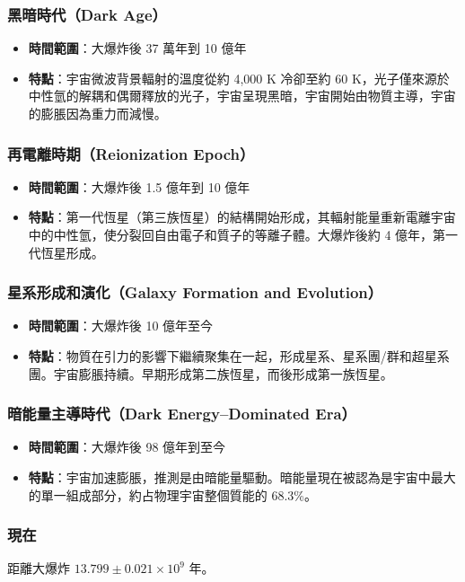 \documentclass[a4paper,12pt]{report}
\begin{document}
\subsubsection{黑暗時代（Dark Age）}
\begin{itemize}
\item \textbf{時間範圍}：大爆炸後 37 萬年到 10 億年
\item \textbf{特點}：宇宙微波背景輻射的溫度從約 4,000 K 冷卻至約 60 K，光子僅來源於中性氫的解耦和偶爾釋放的光子，宇宙呈現黑暗，宇宙開始由物質主導，宇宙的膨脹因為重力而減慢。
\end{itemize}
\subsubsection{再電離時期（Reionization Epoch）}
\begin{itemize}
\item \textbf{時間範圍}：大爆炸後 1.5 億年到 10 億年
\item \textbf{特點}：第一代恆星（第三族恆星）的結構開始形成，其輻射能量重新電離宇宙中的中性氫，使分裂回自由電子和質子的等離子體。大爆炸後約 4 億年，第一代恆星形成。
\end{itemize}
\subsubsection{星系形成和演化（Galaxy Formation and Evolution）}
\begin{itemize}
\item \textbf{時間範圍}：大爆炸後 10 億年至今
\item \textbf{特點}：物質在引力的影響下繼續聚集在一起，形成星系、星系團/群和超星系團。宇宙膨脹持續。早期形成第二族恆星，而後形成第一族恆星。
\end{itemize}
\subsubsection{暗能量主導時代（Dark Energy–Dominated Era）}
\begin{itemize}
\item \textbf{時間範圍}：大爆炸後 98 億年到至今
\item \textbf{特點}：宇宙加速膨脹，推測是由暗能量驅動。暗能量現在被認為是宇宙中最大的單一組成部分，約占物理宇宙整個質能的 68.3\%。
\end{itemize}
\subsubsection{現在}
距離大爆炸 $13.799 \pm 0.021 \times 10^9$ 年。
\end{document}
